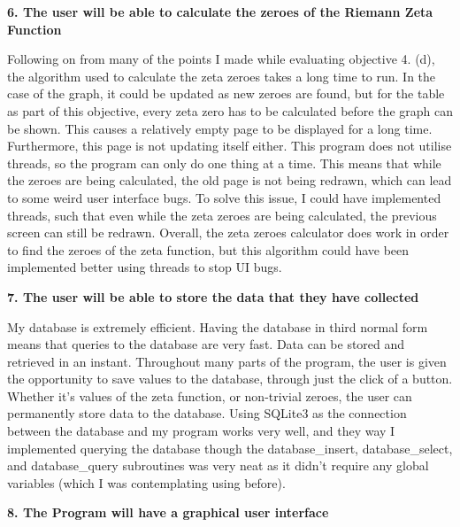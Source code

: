 \documentclass{article}
\begin{document}
\textbf{6. The user will be able to calculate the zeroes of the Riemann Zeta Function}

Following on from many of the points I made while evaluating objective 4. (d), the algorithm used to calculate the zeta zeroes takes a long time to run. In the case of the graph, it could be updated as new zeroes are found, but for the table as part of this objective, every zeta zero has to be calculated before the graph can be shown. This causes a relatively empty page to be displayed for a long time. Furthermore, this page is not updating itself either. This program does not utilise threads, so the program can only do one thing at a time. This means that while the zeroes are being calculated, the old page is not being redrawn, which can lead to some weird user interface bugs. To solve this issue, I could have implemented threads, such that even while the zeta zeroes are being calculated, the previous screen can still be redrawn. Overall, the zeta zeroes calculator does work in order to find the zeroes of the zeta function, but this algorithm could have been implemented better using threads to stop UI bugs.


\textbf{7. The user will be able to store the data that they have collected}

My database is extremely efficient. Having the database in third normal form means that queries to the database are very fast. Data can be stored and retrieved in an instant. Throughout many parts of the program, the user is given the opportunity to save values to the database, through just the click of a button. Whether it's values of the zeta function, or non-trivial zeroes, the user can permanently store data to the database. Using SQLite3 as the connection between the database and my program works very well, and they way I implemented querying the database though the database\_insert, database\_select, and database\_query subroutines was very neat as it didn't require any global variables (which I was contemplating using before).


\textbf{8. The Program will have a graphical user interface}
\end{document}
